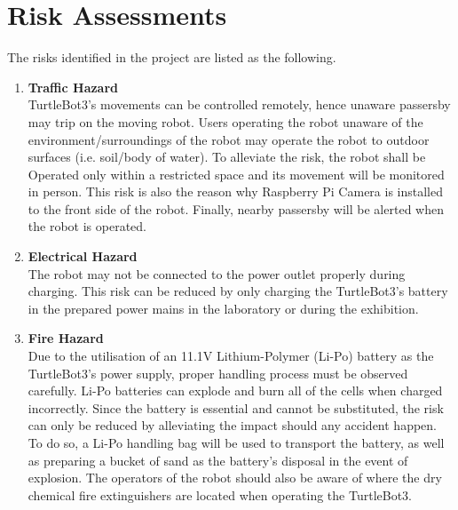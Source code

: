 \documentclass[12pt]{report}
\begin{document}
\chapter{Risk Assessments}
The risks identified in the project are listed as the following.\par

\begin{enumerate}
    \item \textbf{Traffic Hazard} \\
    TurtleBot3’s movements can be controlled remotely, hence unaware passersby may trip on the moving robot. Users operating the robot unaware of the environment/surroundings of the robot may operate the robot to outdoor surfaces (i.e. soil/body of water). To alleviate the risk, the robot shall be Operated only within a restricted space and its movement will be monitored in person. This risk is also the reason why Raspberry Pi Camera is installed to the front side of the robot. Finally, nearby passersby will be alerted when the robot is operated.\par
    \item \textbf{Electrical Hazard} \\
    The robot may not be connected to the power outlet properly during charging. This risk can be reduced by only charging the TurtleBot3’s battery in the prepared power mains in the laboratory or during the exhibition.\par
    \item \textbf{Fire Hazard} \\
    	Due to the utilisation of an 11.1V Lithium-Polymer (Li-Po) battery as the TurtleBot3’s power supply, proper handling process must be observed carefully. Li-Po batteries can explode and burn all of the cells when charged incorrectly. Since the battery is essential and cannot be substituted, the risk can only be reduced by alleviating the impact should any accident happen. To do so, a Li-Po handling bag will be used to transport the battery, as well as preparing a bucket of sand as the battery’s disposal in the event of explosion. The operators of the robot should also be aware of where the dry chemical fire extinguishers are located when operating the TurtleBot3.\par
\end{enumerate}
\end{document}
